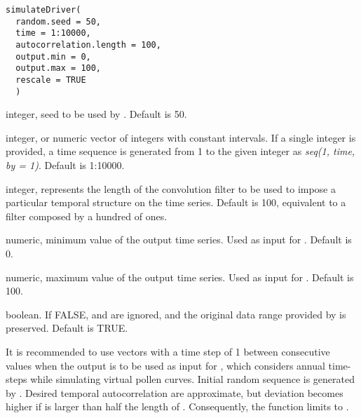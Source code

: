 \documentclass[letterpaper]{book}
\begin{document}
%
\begin{Usage}
\begin{verbatim}
simulateDriver(
  random.seed = 50,
  time = 1:10000,
  autocorrelation.length = 100,
  output.min = 0,
  output.max = 100,
  rescale = TRUE
  )
\end{verbatim}
\end{Usage}
%
\begin{Arguments}
\begin{ldescription}
\item[\code{random.seed}] integer, seed to be used by . Default is 50.

\item[\code{time}] integer, or numeric vector of integers with constant intervals. If a single integer is provided, a time sequence is generated from 1 to the given integer as \emph{seq(1, time, by = 1)}. Default is 1:10000.

\item[\code{autocorrelation.length}] integer, represents the length of the convolution filter to be used to impose a particular temporal structure on the time series. Default is 100, equivalent to a filter composed by a hundred of ones.

\item[\code{output.min}] numeric, minimum value of the output time series. Used as input for . Default is 0.

\item[\code{output.max}] numeric, maximum value of the output time series. Used as input for . Default is 100.

\item[\code{rescale}] boolean. If FALSE,  and  are ignored, and the original data range provided by  is preserved. Default is TRUE.
\end{ldescription}
\end{Arguments}
%
\begin{Details}\relax
It is recommended to use  vectors with a time step of 1 between consecutive values when the output is to be used as input for , which considers annual time-steps while simulating virtual pollen curves. Initial random sequence is generated by . Desired temporal autocorrelation are approximate, but deviation becomes higher if  is larger than half the length of . Consequently, the function limits  to .
\end{Details}
\end{document}
